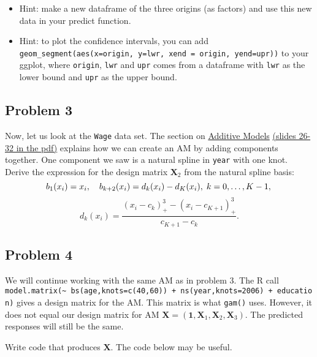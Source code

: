 \documentclass[]{article}
\begin{document}
\begin{itemize}
\item
  Hint: make a new dataframe of the three origins (as factors) and use
  this new data in your predict function.
\item
  Hint: to plot the confidence intervals, you can add
  \texttt{geom\_segment(aes(x=origin,\ y=lwr,\ xend\ =\ origin,\ yend=upr))}
  to your ggplot, where \texttt{origin}, \texttt{lwr} and \texttt{upr}
  comes from a dataframe with \texttt{lwr} as the lower bound and
  \texttt{upr} as the upper bound.
\end{itemize}

\subsection{Problem 3}\label{problem-3}

Now, let us look at the \texttt{Wage} data set. The section on
\href{https://htmlpreview.github.io/?https://github.com/stefaniemuff/statlearning/blob/master/7BeyondLinear/7BeyondLinear.html}{Additive
Models}
\href{https://github.com/stefaniemuff/statlearning/blob/master/7BeyondLinear/7BeyondLinear.pdf}{(slides
26-32 in the pdf)} explains how we can create an AM by adding components
together. One component we saw is a natural spline in \texttt{year} with
one knot. Derive the expression for the design matrix \(\mathbf X_2\)
from the natural spline basis: \[
b_1(x_i) = x_i, \quad b_{k+2}(x_i) = d_k(x_i)-d_K(x_i),\; k = 0, \ldots, K - 1,\\
\] \[
d_k(x_i) = \frac{(x_i-c_k)^3_+-(x_i-c_{K+1})^3_+}{c_{K+1}-c_k}.
\]

\subsection{Problem 4}\label{problem-4}

We will continue working with the same AM as in problem 3. The R call
\texttt{model.matrix(\textasciitilde{}\ bs(age,knots=c(40,60))\ +\ ns(year,knots=2006)\ +\ education)}
gives a design matrix for the AM. This matrix is what \texttt{gam()}
uses. However, it does not equal our design matrix for AM
\(\mathbf X = (\mathbf{1}, \mathbf{X}_1, \mathbf{X}_2, \mathbf{X}_3)\).
The predicted responses will still be the same.

Write code that produces \(\mathbf X\). The code below may be useful.
\end{document}
